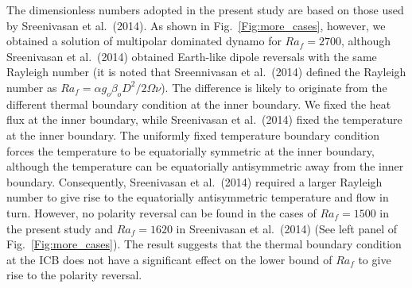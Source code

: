 The dimensionless numbers adopted in the present study are based on those used by Sreenivasan et al.\ (2014). %
As shown in Fig.~\ref{Fig:more_cases}, however, we obtained a solution of multipolar dominated dynamo for $Ra_f = 2700$, although Sreenivasan et al.\ (2014) obtained Earth-like dipole reversals with the same Rayleigh number (it is noted that Sreennivasan et al.\ (2014) defined the Rayleigh number as $Ra_f = \alpha g_o \beta_o D^2 / 2\Omega \nu$).
The difference is likely to originate from the different thermal boundary condition at the inner boundary. 
We fixed the heat flux at the inner boundary, while Sreenivasan et al.\ (2014) fixed the temperature at the inner boundary. 
{\color{red}
The uniformly fixed temperature boundary condition forces the temperature to be equatorially symmetric at the inner boundary, although the temperature can be equatorially antisymmetric away from the inner boundary.
}
Consequently, Sreenivasan et al.\ (2014) required a larger Rayleigh number to give rise to the equatorially antisymmetric temperature and flow in turn. 
{\color{green}
However, no polarity reversal can be found in the cases of $Ra_f = 1500$ in the present study and $Ra_f = 1620$ in Sreenivasan et al.\ (2014) (See left panel of Fig.~\ref{Fig:more_cases}). 
The result suggests that the thermal boundary condition at the ICB does not have a significant effect on the lower bound of $Ra_f$ to give rise to the polarity reversal.
}



